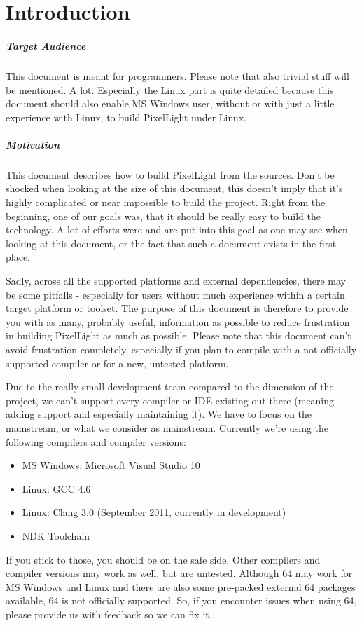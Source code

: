 \chapter{Introduction}


\paragraph{Target Audience}
This document is meant for programmers. Please note that also trivial stuff will be mentioned. A lot. Especially the Linux part is quite detailed because this document should also enable MS Windows user, without or with just a little experience with Linux, to build PixelLight under Linux.


\paragraph{Motivation}
This document describes how to build PixelLight from the sources. Don't be shocked when looking at the size of this document, this doesn't imply that it's highly complicated or near impossible to build the project. Right from the beginning, one of our goals was, that it should be really easy to build the technology. A lot of efforts were and are put into this goal as one may see when looking at this document, or the fact that such a document exists in the first place.

Sadly, across all the supported platforms and external dependencies, there may be some pitfalls - especially for users without much experience within a certain target platform or toolset. The purpose of this document is therefore to provide you with as many, probably useful, information as possible to reduce frustration in building PixelLight as much as possible. Please note that this document can't avoid frustration completely, especially if you plan to compile with a not officially supported compiler or for a new, untested platform.

Due to the really small development team compared to the dimension of the project, we can't support every compiler or IDE existing out there (meaning adding support and especially maintaining it). We have to focus on the mainstream, or what we consider as mainstream. Currently we're using the following compilers and compiler versions:
\begin{itemize}
\item{MS Windows: Microsoft Visual Studio 10}
\item{Linux: \ac{GCC} 4.6}
\item{Linux: Clang 3.0 (September 2011, currently in development)}
\item{\ac{NDK} Toolchain}
\end{itemize}
If you stick to those, you should be on the safe side. Other compilers and compiler versions may work as well, but are untested. Although \SI{64}{\bit} may work for MS Windows and Linux and there are also some pre-packed external \SI{64}{\bit} packages available, \SI{64}{\bit} is not officially supported. So, if you encounter issues when using \SI{64}{\bit}, please provide us with feedback so we can fix it.

